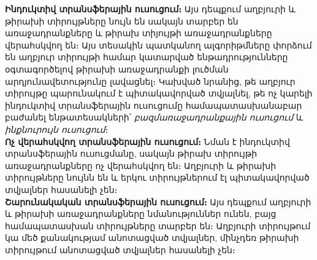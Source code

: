 \documentclass[12pt]{article}
\begin{document}
\noindent \textbf{Ինդուկտիվ տրանսֆերային ուսուցում։}  Այս դեպքում աղբյուրի և թիրախի տիրույթները նույն են սակայն տարբեր են առաջադրանքները և թիրախ տիյույթի առաջադրանքները վերահսկվող են։ Այս տեսակին պատկանող ալգորիթմները փորձում են աղբյուր տիրույթի համար կատարված ենթադրությունները օգտագործելով  թիրախի առաջադրանքի լուծման արդյունավետությունը լավացնել։ Կախված նրանից, թե աղբյուր տիրույթը պարունակում է պիտակավորված տվյալնել, թե ոչ  կարելի ինդուկտիվ տրանսֆերային ուսուցումը համապատասխանաբար բաժանել ենթատեսակների՝ \textit{բազմառաջադրանքային ուսուցում} և  \textit{ինքնուրույն ուսուցում}։\\

\noindent \textbf{Ոչ վերահսկվող տրանսֆերային ուսուցում։} Նման է ինդուկտիվ տրանսֆերային ուսուցմանը, սակայն թիրախ տիրույթի առաջադրանքները ոչ վերահսկվող  են։ Աղբյուրի և թիրախի տիրույթները  նույնն են և երկու տիրույթներում էլ պիտակավորված տվյալներ հասանելի չեն։ \\


\noindent \textbf{Շարունակական տրանսֆերային ուսուցում։}
Այս դեպքում աղբյուրի և թիրախի առաջադրանքները նմանություններ ունեն, բայց համապատասխան տիրույթները տարբեր են։ Աղբյուրի տիրույթում կա մեծ քանակությամ անոտացված տվյալներ, մինչդեռ թիրախի տիրույթում անոտացված տվյալներ հասանելի չեն։ \\

\begin{center}
\subsection*{
 } 
 \end{center}
 \noindent
{}
{}
\end{document}

